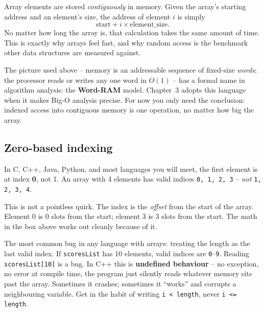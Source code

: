 \documentclass[11pt]{article}
\begin{document}
\begin{ideabox}
Array elements are stored \emph{contiguously} in memory. Given the
array's starting address and an element's size, the address of element
$i$ is simply
\[
\text{start} + i \times \text{element\_size}.
\]
No matter how long the array is, that calculation takes the same
amount of time. This is exactly why arrays feel fast, and why random
access is the benchmark other data structures are measured against.
\end{ideabox}

\begin{notebox}
The picture used above -- memory is an addressable sequence of fixed-size
\emph{words}; the processor reads or writes any one word in $O(1)$ -- has
a formal name in algorithm analysis: the \textbf{Word-RAM} model.
Chapter~3 adopts this language when it makes Big-O analysis precise. For
now you only need the conclusion: indexed access into contiguous memory
is one operation, no matter how big the array.
\end{notebox}

\subsection{Zero-based indexing}

In C, C++, Java, Python, and most languages you will meet, the first
element is at index \textbf{0}, not 1. An array with 4 elements has
valid indices \texttt{0, 1, 2, 3} -- \emph{not} \texttt{1, 2, 3, 4}.

This is not a pointless quirk. The index is the \emph{offset} from the
start of the array. Element 0 is 0 slots from the start; element 3 is 3
slots from the start. The math in the box above works out cleanly
because of it.

\begin{warnbox}
The most common bug in any language with arrays: treating the length as
the last valid index. If \texttt{scoresList} has 10 elements, valid
indices are \texttt{0}--\texttt{9}. Reading \texttt{scoresList[10]} is
a bug.
In C++ this is \textbf{undefined behaviour} -- no exception, no error
at compile time, the program just silently reads whatever memory sits
past the array. Sometimes it crashes; sometimes it ``works'' and
corrupts a neighbouring variable. Get in the habit of writing
\texttt{i < length}, never \texttt{i <= length}.
\end{warnbox}
\end{document}
